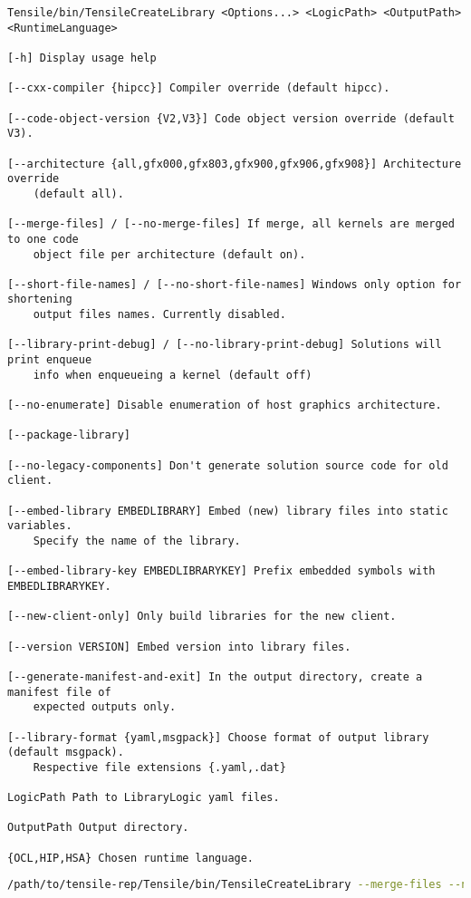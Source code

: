 \documentclass[]{article}
\begin{document}
\begin{lstlisting}
Tensile/bin/TensileCreateLibrary <Options...> <LogicPath> <OutputPath> <RuntimeLanguage>

[-h] Display usage help

[--cxx-compiler {hipcc}] Compiler override (default hipcc).

[--code-object-version {V2,V3}] Code object version override (default V3).

[--architecture {all,gfx000,gfx803,gfx900,gfx906,gfx908}] Architecture override
    (default all).

[--merge-files] / [--no-merge-files] If merge, all kernels are merged to one code
    object file per architecture (default on).

[--short-file-names] / [--no-short-file-names] Windows only option for shortening
    output files names. Currently disabled.

[--library-print-debug] / [--no-library-print-debug] Solutions will print enqueue
    info when enqueueing a kernel (default off)

[--no-enumerate] Disable enumeration of host graphics architecture.

[--package-library]

[--no-legacy-components] Don't generate solution source code for old client.

[--embed-library EMBEDLIBRARY] Embed (new) library files into static variables.
    Specify the name of the library.

[--embed-library-key EMBEDLIBRARYKEY] Prefix embedded symbols with EMBEDLIBRARYKEY.

[--new-client-only] Only build libraries for the new client.

[--version VERSION] Embed version into library files.

[--generate-manifest-and-exit] In the output directory, create a manifest file of
    expected outputs only.

[--library-format {yaml,msgpack}] Choose format of output library (default msgpack).
    Respective file extensions {.yaml,.dat}

LogicPath Path to LibraryLogic yaml files.

OutputPath Output directory.

{OCL,HIP,HSA} Chosen runtime language.
\end{lstlisting}

\begin{lstlisting}[language=bash]
/path/to/tensile-rep/Tensile/bin/TensileCreateLibrary --merge-files --no-legacy-components --no-short-file-names --no-library-print-debug --code-object-version=V3 --cxx-compiler=hipcc --library-format=msgpack path/to/new/logic path/to/drop/new/tensile HIP
\end{lstlisting}
\end{document}
